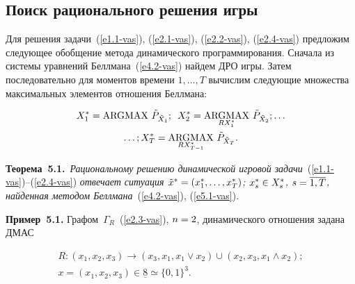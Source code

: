 \begin{multicols}{2}
\vspace*{-11pt}

\section{Поиск рационального решения игры}

\vspace*{-1pt}

    Для решения задачи~(\ref{e1.1-vas}), (\ref{e2.1-vas}), (\ref{e2.2-vas}),  
(\ref{e2.4-vas}) предложим сле\-ду\-ющее обобщение метода динамического\linebreak 
программирования. Сначала из системы уравнений Беллмана~(\ref{e4.2-vas}) 
найдем ДРО игры. Затем последовательно для моментов времени $1,\ldots, T$ 
вычислим сле\-ду\-ющие множества максимальных \mbox{элементов} отношения Беллмана:

\pagebreak



\noindent
    \begin{multline}
    X_1^*=\mathop{\mathrm{ARGMAX}}\,\tilde{P}_{\tilde{X}_1};\enskip 
    X_2^*=\mathop{\mathrm{ARGMAX}}\limits_{RX_1^*}\, \tilde{P}_{\tilde{X}_2}; \ldots  \\
\ldots ;    X_T^* = \mathop{\mathrm{ARGMAX}}\limits_{RX^*_{T-1}}\,\tilde{P}_{\tilde{X}_T}.
       \label{e5.1-vas}
    \end{multline}
    
\vspace*{-3pt}

    \noindent
    \textbf{Теорема~5.1.}\ \textit{Рациональному решению динамической игровой 
задачи}~(\ref{e1.1-vas})--(\ref{e2.4-vas}) \textit{отвечает ситуация 
$\tilde{x}^*\hm= (x_1^*, \ldots , x_T^*)$; $x_s^*\hm\in X_s^*$, $s\hm= \overline{1, T}$, 
найденная методом Беллмана}~(\ref{e4.2-vas}), (\ref{e5.1-vas}).
    
    \smallskip
    
    \noindent
    \textbf{Пример~5.1.} Графом~$\Gamma_R$~(\ref{e2.3-vas}), $n\hm=2$, 
динамического отношения задана ДМАС 

\vspace*{-4pt}

\noindent
    \begin{multline*}
    R: (x_1, x_2, x_3) \to (x_3, x_1, x_1\vee x_2) \cup (x_2, x_3, x_1\wedge x_2);\\
    x=(x_1, x_2, x_3)\in\underline{8}\simeq \{0,1\}^3.
    \end{multline*}
    

\end{multicols}
